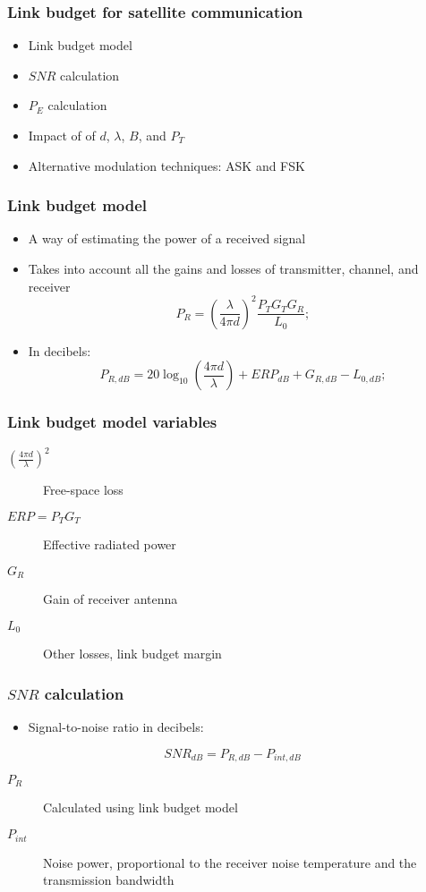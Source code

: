 \documentclass{beamer}
\begin{document}
\begin{frame}
	\frametitle{Link budget for satellite communication}
	\begin{itemize}
		\item Link budget model
		\item $SNR$ calculation
		\item $P_E$ calculation
		\item Impact of of $d$, $\lambda$, $B$, and $P_T$
		\item Alternative modulation techniques: ASK and FSK
	\end{itemize}
\end{frame}

\begin{frame}
	\frametitle{Link budget model}
	\begin{itemize}
		\item A way of estimating the power of a received signal
		\item Takes into account all the gains and losses of transmitter, channel, and receiver
		\begin{equation}
			P_R = \left(\frac{\lambda}{4 \pi d}\right)^2 \frac{P_T G_T G_R}{L_0};
		\end{equation}
		\item In decibels:
		\begin{equation}
			P_{R, dB} = 20\log_{10}\left(\frac{4 \pi d}{\lambda}\right) + {ERP}_{dB} + G_{R, dB} - L_{0, dB};
		\end{equation}
	\end{itemize}
\end{frame}

\begin{frame}
	\frametitle{Link budget model variables}
	\begin{description}
		\item[$(\frac{4 \pi d}{\lambda})^2$] Free-space loss
		\item[$ERP = P_T G_T$] Effective radiated power
		\item[$G_R$] Gain of receiver antenna
		\item[$L_0$] Other losses, link budget margin
	\end{description}
\end{frame}

\begin{frame}
	\frametitle{$SNR$ calculation}
	\begin{itemize}
		\item Signal-to-noise ratio in decibels:
	\end{itemize}
	\begin{equation}
		{SNR}_{dB} = P_{R, dB} - P_{int, dB}
	\end{equation}
	\begin{description}
		\item[$P_R$] Calculated using link budget model
		\item[$P_{int}$] Noise power, proportional to the receiver noise temperature and the transmission bandwidth
	\end{description}
\end{frame}
\end{document}
